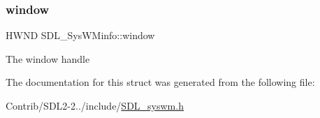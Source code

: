 \subsubsection{\texorpdfstring{window}{window}}
{\footnotesize\ttfamily H\+W\+ND S\+D\+L\+\_\+\+Sys\+W\+Minfo\+::window}

The window handle 

The documentation for this struct was generated from the following file\+:\begin{DoxyCompactItemize}
\item 
Contrib/\+S\+D\+L2-\/2../include/\mbox{\hyperlink{_s_d_l__syswm_8h}{S\+D\+L\+\_\+syswm.\+h}}\end{DoxyCompactItemize}
